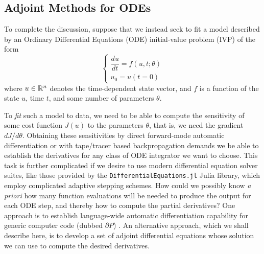 \subsection{Adjoint Methods for ODEs}
To complete the discussion, suppose that we instead seek to fit a model described by an Ordinary Differential Equations (ODE) initial-value problem (IVP) of the form
\begin{equation}
  \begin{cases}
    \dfrac{du}{dt} = f(u, t; \theta) \\
    u_0 = u(t=0)
  \end{cases}
\end{equation}
where $u\in\mathbb{R}^n$ denotes the time-dependent state vector, and $f$ is a function of the state $u$, time $t$, and some number of parameters $\theta$.

To \textit{fit} such a model to data, we need to be able to compute the sensitivity of some cost function $J(u)$ to the parameters $\theta$, that is, we need the gradient $d J/ d \theta$. Obtaining these sensitivities by direct forward-mode automatic differentiation or with tape/tracer based backpropagation demands we be able to establish the derivatives for any class of ODE integrator we want to choose. This task is further complicated if we desire to use modern differential equation solver suites, like those provided by the \texttt{DifferentialEquations.jl} Julia library, which employ complicated adaptive stepping schemes. How could we possibly know \textit{a priori} how many function evaluations will be needed to produce the output for each ODE step, and thereby how to compute the partial derivatives? One approach is to establish language-wide automatic differentiation capability for generic computer code (dubbed $\partial P$) \cite{differentiable-programming}. An alternative approach, which we shall describe here, is to develop a set of adjoint differential equations whose solution we can use to compute the desired derivatives.


